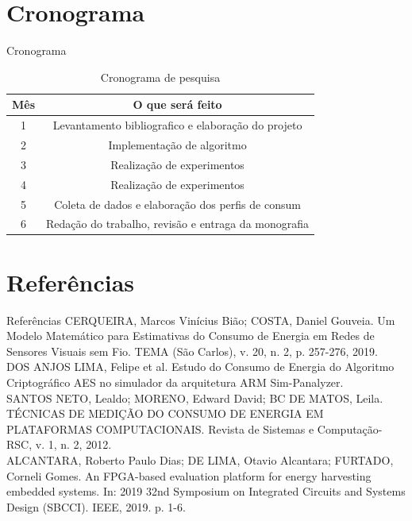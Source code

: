 \documentclass{IFES-beamer}
\begin{document}
\section{Cronograma}

\begin{frame}{Cronograma}

\begin{table}[!hp]
\centering
   \caption{Cronograma de pesquisa}

\begin{tabular}{|c|c|}
 
	\hline
	Mês &  O que será feito\\
	\hline
   1 &  Levantamento bibliografico e elaboração do projeto\\
	\hline
   2 &  Implementação de algoritmo\\
	\hline
	  3 &  Realização de experimentos\\
	\hline  
	4 & Realização de experimentos\\
	\hline  
	5 &  Coleta de dados e elaboração dos perfis de consum\\
	\hline
	  6 & Redação do trabalho, revisão e entraga da monografia\\
	\hline
	
\end{tabular}
\end{table}

\end{frame}


\section{Referências}

\begin{frame}{Referências}
CERQUEIRA, Marcos Vinícius Bião; COSTA, Daniel Gouveia. Um Modelo Matemático para Estimativas do Consumo de Energia em Redes de Sensores Visuais sem Fio. TEMA (São Carlos), v. 20, n. 2, p. 257-276, 2019.\\

DOS ANJOS LIMA, Felipe et al. Estudo do Consumo de Energia do Algoritmo Criptográfico AES no simulador da arquitetura ARM Sim-Panalyzer.\\

SANTOS NETO, Lealdo; MORENO, Edward David; BC DE MATOS, Leila. TÉCNICAS DE MEDIÇÃO DO CONSUMO DE ENERGIA EM PLATAFORMAS COMPUTACIONAIS. Revista de Sistemas e Computação-RSC, v. 1, n. 2, 2012.\\

ALCANTARA, Roberto Paulo Dias; DE LIMA, Otavio Alcantara; FURTADO, Corneli Gomes. An FPGA-based evaluation platform for energy harvesting embedded systems. In: 2019 32nd Symposium on Integrated Circuits and Systems Design (SBCCI). IEEE, 2019. p. 1-6.\\

\end{frame}
  
\end{document}
